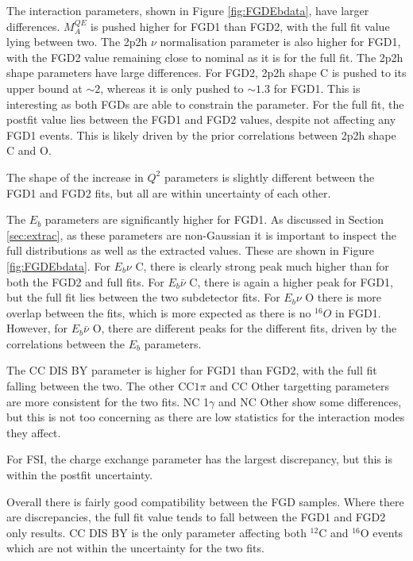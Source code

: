 The interaction parameters, shown in Figure \ref{fig:FGDEbdata}, have larger differences. $M_{A}^{QE}$ is pushed higher for FGD1 than FGD2, with the full fit value lying between two. The 2p2h $\nu$ normalisation parameter is also higher for FGD1, with the FGD2 value remaining close to nominal as it is for the full fit. The 2p2h shape parameters have large differences. For FGD2, 2p2h shape C is pushed to its upper bound at $\sim2$, whereas it is only pushed to $\sim1.3$ for FGD1. This is interesting as both FGDs are able to constrain the parameter. For the full fit, the postfit value lies between the FGD1 and FGD2 values, despite not affecting any FGD1 events. This is likely driven by the prior correlations between 2p2h shape C and O.

The shape of the increase in $Q^2$ parameters is slightly different between the FGD1 and FGD2 fits, but all are within uncertainty of each other.

The $E_b$ parameters are significantly higher for FGD1. As discussed in Section \ref{sec:extrac}, as these parameters are non-Gaussian it is important to inspect the full distributions as well as the extracted values. These are shown in Figure \ref{fig:FGDEbdata}. For $E_b \nu$ C, there is clearly strong peak much higher than for both the FGD2 and full fits. For $E_b \bar{\nu}$ C, there is again a higher peak for FGD1, but the full fit lies between the two subdetector fits. For $E_b \nu$ O there is more overlap between the fits, which is more expected as there is no $^{16}O$ in FGD1. However, for $E_b \bar{\nu}$ O, there are different peaks for the different fits, driven by the correlations between the $E_b$ parameters.

The CC DIS BY parameter is higher for FGD1 than FGD2, with the full fit falling between the two. The other CC$ 1\pi$ and CC Other targetting parameters are more consistent for the two fits. NC 1$\gamma$ and NC Other show some differences, but this is not too concerning as there are low statistics for the interaction modes they affect.

For FSI, the charge exchange parameter has the largest discrepancy, but this is within the postfit uncertainty.

Overall there is fairly good compatibility between the FGD samples. Where there are discrepancies, the full fit value tends to fall between the FGD1 and FGD2 only results. CC DIS BY is the only parameter affecting both $^{12}$C and $^{16}$O events which are not within the uncertainty for the two fits. 

